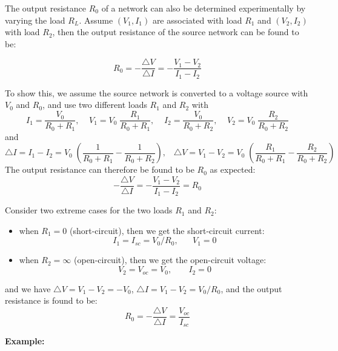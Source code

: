 \begin{itemize}

The output resistance $R_0$ of a network can also be determined 
experimentally by varying the load $R_L$. Assume $(V_1, I_1)$ are 
associated with load $R_1$ and $(V_2, I_2)$ with load $R_2$, then 
the output resistance of the source network can be found to be:

\[ R_0=-\frac{\triangle V}{\triangle I}=-\frac{V_1-V_2}{I_1-I_2} \]

To show this, we assume the source network is converted to a voltage
source with $V_0$ and $R_0$, and use two different loads $R_1$ and
$R_2$ with
\[ I_1=\frac{V_0}{R_0+R_1},\;\;\;\;V_1=V_0\;\frac{R_1}{R_0+R_1},\;\;\;\;
   I_2=\frac{V_0}{R_0+R_2},\;\;\;\;V_2=V_0\;\frac{R_2}{R_0+R_2} \]
and
\[ 
\triangle I=I_1-I_2=V_0\;\left(\frac{1}{R_0+R_1}-\frac{1}{R_0+R_2}\right),
\;\;\;   \triangle V=V_1-V_2=V_0\;\left(\frac{R_1}{R_0+R_1}-\frac{R_2}{R_0+R_2}\right)
\]
The output resistance can therefore be found to be $R_0$ as expected:
\[ -\frac{\triangle V}{\triangle I}=-\frac{V_1-V_2}{I_1-I_2}=R_0 \]

Consider two extreme cases for the two loads $R_1$ and $R_2$:
\begin{itemize}
\item when $R_1=0$ (short-circuit), then we get the short-circuit 
  current: 
  \[ I_1=I_{sc}=V_0/R_0,\;\;\;\;\;\; V_1=0 \]
\item when $R_2=\infty$ (open-circuit), then we get the open-circuit
  voltage: 
  \[ V_2=V_{oc}=V_0,\;\;\;\;\;\;\;I_2=0 \]
\end{itemize}
and we have $\triangle V=V_1-V_2=-V_0$, $\triangle I=V_1-V_2=V_0/R_0$,
and the output resistance is found to be:
\[ R_0=-\frac{\triangle V}{\triangle I}=\frac{V_{oc}}{I_{sc}} \]

{\bf Example:}



\end{itemize}
